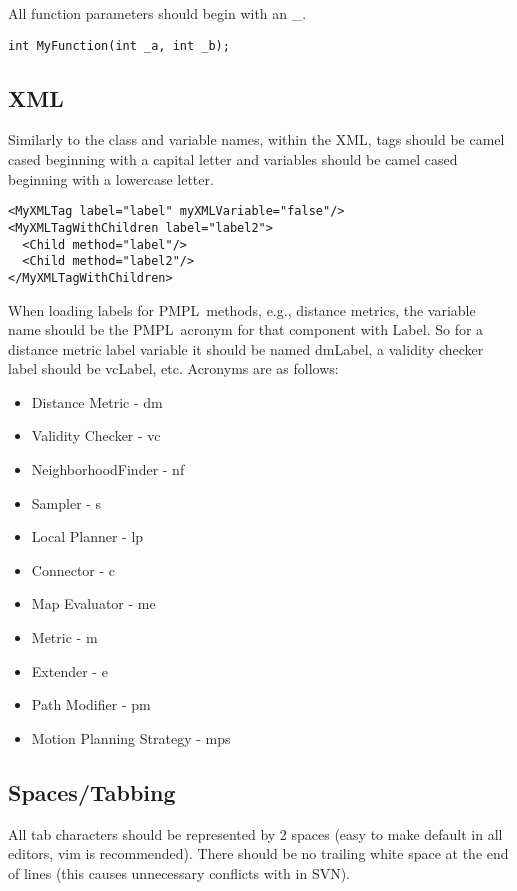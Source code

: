 \documentclass[12pt]{article}
\newcommand{\pmpl}{PMPL}
\begin{document}
All function parameters should begin with an \_.

\begin{lstlisting}
int MyFunction(int _a, int _b);
\end{lstlisting}

\subsection{XML}
Similarly to the class and variable names, within the XML, tags should be camel
cased beginning with a capital letter and variables should be camel cased
beginning with a lowercase letter.

\lstset{style=XML}
\begin{lstlisting}
<MyXMLTag label="label" myXMLVariable="false"/>
<MyXMLTagWithChildren label="label2">
  <Child method="label"/>
  <Child method="label2"/>
</MyXMLTagWithChildren>
\end{lstlisting}
\lstset{style=C++}

When loading labels for \pmpl\ methods, e.g., distance metrics, the variable
name should be the \pmpl\ acronym for that component with Label. So for a
distance metric label variable it should be named dmLabel, a validity checker
label should be vcLabel, etc. Acronyms are as follows:

\begin{itemize}
  \item Distance Metric - dm
  \item Validity Checker - vc
  \item NeighborhoodFinder - nf
  \item Sampler - s
  \item Local Planner - lp
  \item Connector - c
  \item Map Evaluator - me
  \item Metric - m
  \item Extender - e
  \item Path Modifier - pm
  \item Motion Planning Strategy - mps
\end{itemize}

\subsection{Spaces/Tabbing}
All tab characters should be represented by 2 spaces (easy to make default in
all editors, vim is recommended). There should be no trailing white space at the
end of lines (this causes unnecessary conflicts with in SVN).
\end{document}
